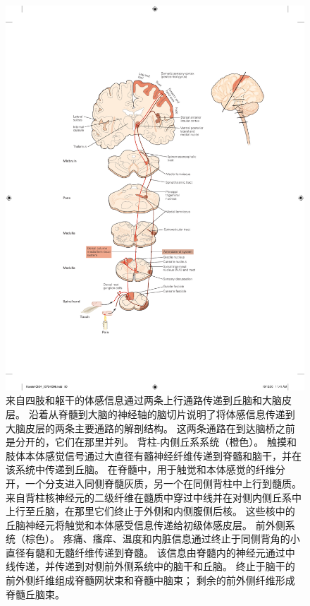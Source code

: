 \begin{figure}[htbp]
	\centering
	\includegraphics[width=1.0\linewidth]{chap04/fig_4_6}
	\caption{来自四肢和躯干的体感信息通过两条上行通路传递到丘脑和大脑皮层。
		沿着从脊髓到大脑的神经轴的脑切片说明了将体感信息传递到大脑皮层的两条主要通路的解剖结构。
		这两条通路在到达脑桥之前是分开的，它们在那里并列。 背柱-内侧丘系系统（橙色）。
		触摸和肢体本体感觉信号通过大直径有髓神经纤维传递到脊髓和脑干，并在该系统中传递到丘脑。
		在脊髓中，用于触觉和本体感觉的纤维分开，一个分支进入同侧脊髓灰质，另一个在同侧背柱中上行到髓质。 
		来自背柱核神经元的二级纤维在髓质中穿过中线并在对侧内侧丘系中上行至丘脑，在那里它们终止于外侧和内侧腹侧后核。
		这些核中的丘脑神经元将触觉和本体感受信息传递给初级体感皮层。
		前外侧系统（棕色）。
		疼痛、瘙痒、温度和内脏信息通过终止于同侧背角的小直径有髓和无髓纤维传递到脊髓。
		该信息由脊髓内的神经元通过中线传递，并传递到对侧前外侧系统中的脑干和丘脑。
		终止于脑干的前外侧纤维组成脊髓网状束和脊髓中脑束； 剩余的前外侧纤维形成脊髓丘脑束。}
	\label{fig:4_6}
\end{figure}


